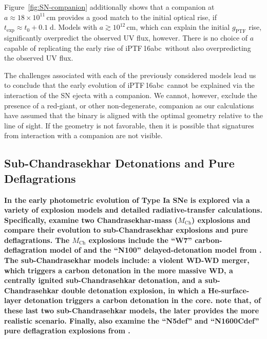 \documentclass[twocolumn]{aastex61}
\newcommand{\abc}{iPTF\,16abc}
\begin{document}
Figure~\ref{fig:SN-companion} additionally shows that a companion at $a \approx 18 \times 10^{11} \, \mathrm{cm}$ provides a good match to the initial optical rise, if $t_\mathrm{exp} \approx t_0 + 0.1 \; \mathrm{d}$. Models with $a \gtrsim 10^{12} \, \mathrm{cm}$, which can explain the initial $g_\mathrm{PTF}$ rise, significantly overpredict the observed UV flux, however. There is no choice of $a$ capable of replicating the early rise of \abc\ without also overpredicting the observed UV flux.

The challenges associated with each of the previously considered models lead us to conclude that the early evolution of \abc\ cannot be explained via the interaction of the SN ejecta with a companion. We cannot, however, exclude the presence of a red-giant, or other non-degenerate, companion as our calculations have assumed that the binary is aligned with the optimal geometry relative to the line of sight. If the geometry is not favorable, then it is possible that signatures from interaction with a companion are not visible. 

\subsection{\textbf{Sub-Chandrasekhar Detonations and Pure Deflagrations}}

\textbf{In \citet{2017MNRAS.472.2787N} the early photometric evolution of Type
Ia SNe is explored via a variety of explosion models and detailed
radiative-transfer calculations. Specifically, \citet{2017MNRAS.472.2787N}
examine two Chandrasekhar-mass ($M_\mathrm{Ch}$) explosions and compare their
evolution to sub-Chandrasekhar explosions and pure deflagrations. The
$M_\mathrm{Ch}$ explosions include the ``W7'' carbon-deflagration model of
\citet{1984ApJ...286..644N} and the ``N100'' delayed-detonation model from
\citet{2013MNRAS.429.1156S}. The sub-Chandrasekhar models include: a violent
WD-WD merger, which triggers a carbon detonation in the more massive WD, a
centrally ignited sub-Chandrasehkar detonation, and a sub-Chandrasehkar double
detonation explosion, in which a He-surface-layer detonation triggers a carbon
detonation in the core. \citet{2017MNRAS.472.2787N} note that, of these
last two sub-Chandrasehkar models, the later provides the more realistic
scenario. Finally, \citet{2017MNRAS.472.2787N} also examine the ``N5def'' and
``N1600Cdef'' pure deflagration explosions from \citet{2014MNRAS.438.1762F}.}
\end{document}
